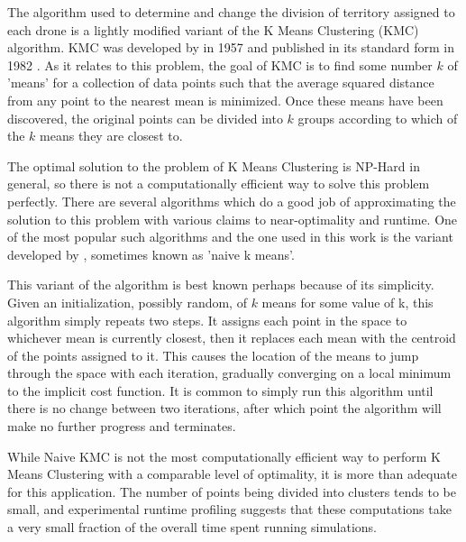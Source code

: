 The algorithm used to determine and change the division of territory assigned to each drone is a lightly modified variant of the K Means Clustering (KMC) algorithm. KMC was developed by \citeauthor{KMC} in 1957 and published in its standard form in 1982 \cite{KMC}. As it relates to this problem, the goal of KMC is to find some number $k$ of 'means' for a collection of data points such that the average squared distance from any point to the nearest mean is minimized. Once these means have been discovered, the original points can be divided into $k$ groups according to which of the $k$ means they are closest to.

The optimal solution to the problem of K Means Clustering is NP-Hard in general, so there is not a computationally efficient way to solve this problem perfectly. There are several algorithms which do a good job of approximating the solution to this problem with various claims to near-optimality and runtime. One of the most popular such algorithms and the one used in this work is the variant developed by \citeauthor{KMC}, sometimes known as 'naive k means'.

This variant of the algorithm is best known perhaps because of its simplicity. Given an initialization, possibly random, of $k$ means for some value of k, this algorithm simply repeats two steps. It assigns each point in the space to whichever mean is currently closest, then it replaces each mean with the centroid of the points assigned to it. This causes the location of the means to jump through the space with each iteration, gradually converging on a local minimum to the implicit cost function. It is common to simply run this algorithm until there is no change between two iterations, after which point the algorithm will make no further progress and terminates.

While Naive KMC is not the most computationally efficient way to perform K Means Clustering with a comparable level of optimality, it is more than adequate for this application. The number of points being divided into clusters tends to be small, and experimental runtime profiling suggests that these computations take a very small fraction of the overall time spent running simulations.

